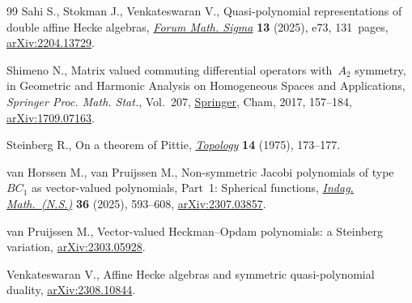 \documentclass[pdftex]{sigma}
\theoremstyle{definition}
\numberwithin{equation}{section}
\begin{document}
\begin{thebibliography}{99}
Sahi S., Stokman J., Venkateswaran V., Quasi-polynomial representations of
 double affine {H}ecke algebras,
 \href{https://doi.org/10.1017/fms.2025.33}{\textit{Forum Math. Sigma}}
 \textbf{13} (2025), e73, 131~pages,
 \href{http://arxiv.org/abs/2204.13729}{arXiv:2204.13729}.

Shimeno N., Matrix valued commuting differential operators with~{$A_2$}
 symmetry, in Geometric and {H}armonic {A}nalysis on {H}omogeneous {S}paces
 and {A}pplications, \textit{Springer Proc. Math. Stat.}, Vol.~207,
 \href{https://doi.org/10.1007/978-3-319-65181-1_6}{Springer}, Cham, 2017,
 157--184, \href{http://arxiv.org/abs/1709.07163}{arXiv:1709.07163}.

Steinberg R., On a theorem of {P}ittie,
 \href{https://doi.org/10.1016/0040-9383(75)90025-7}{\textit{Topology}}
 \textbf{14} (1975), 173--177.

van Horssen M., van Pruijssen M., Non-symmetric {J}acobi polynomials of
 type~{$B C_1$} as vector-valued polynomials, {P}art~1: {S}pherical functions,
 \href{https://doi.org/10.1016/j.indag.2024.09.003}{\textit{Indag.
 Math.~(N.S.)}} \textbf{36} (2025), 593--608,
 \href{http://arxiv.org/abs/2307.03857}{arXiv:2307.03857}.

van Pruijssen M., Vector-valued {H}eckman--{O}pdam polynomials: a {S}teinberg
 variation, \href{http://arxiv.org/abs/2303.05928}{arXiv:2303.05928}.

Venkateswaran V., Affine Hecke algebras and symmetric quasi-polynomial duality,
 \href{http://arxiv.org/abs/2308.10844}{arXiv:2308.10844}.

\end{thebibliography}\LastPageEnding
\end{document}
